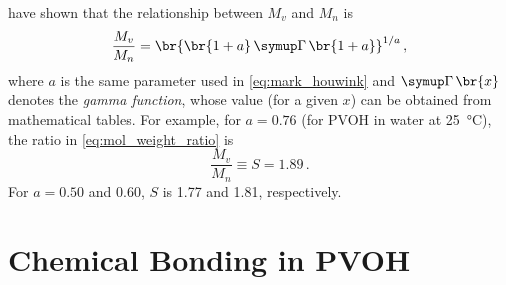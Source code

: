 \documentclass[nobib,nofonts,nols,nohyper]{tufte-handout}
\begin{document}
\textcite{schaefgen48} have shown that the relationship between \( M_v \) and \( M_n \) is
\begin{equation}
	\frac{M_v}{M_n} = \br{\br{1 + a} \GammaFunc\br{1 + a}}^{1/a} \, ,
	\label{eq:mol_weight_ratio}
\end{equation}
where \( a \) is the same parameter used in \cref{eq:mark_houwink} and \( \GammaFunc\br{x} \) denotes the \emph{gamma function}, whose value (for a given \( x \)) can be obtained from mathematical tables. 
For example, for \( a = 0.76 \) (for PVOH in water at \qty{25}{\celsius}),\autocite{flory48} the ratio in \cref{eq:mol_weight_ratio} is 
\begin{equation}
	\frac{M_v}{M_n} \equiv S = 1.89 \, .
	\label{eq:mol_weight_ratio_ex}
\end{equation}
For \( a = 0.50 \) and \num{0.60}, \( S \) is \num{1.77} and \num{1.81}, respectively. 


\section{Chemical Bonding in PVOH} %
\label{sec:chemical_bonding_in_pvoh}
\end{document}
